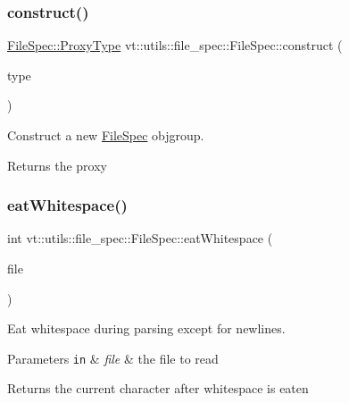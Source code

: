 \subsubsection{\texorpdfstring{construct()}{construct()}}
{\footnotesize\ttfamily \hyperlink{structvt_1_1utils_1_1file__spec_1_1_file_spec_ac4ad61ed146069ab671ec1bf909ebded}{File\+Spec\+::\+Proxy\+Type} vt\+::utils\+::file\+\_\+spec\+::\+File\+Spec\+::construct (\begin{DoxyParamCaption}\item[{\hyperlink{namespacevt_1_1utils_1_1file__spec_adc8912eb2949ca15d0f29afc0342f71e}{File\+Spec\+Type}}]{type }\end{DoxyParamCaption})\hspace{0.3cm}{\ttfamily [static]}}



Construct a new {\ttfamily \hyperlink{structvt_1_1utils_1_1file__spec_1_1_file_spec}{File\+Spec}} objgroup. 

\begin{DoxyReturn}{Returns}
the proxy 
\end{DoxyReturn}
\mbox{\label{structvt_1_1utils_1_1file__spec_1_1_file_spec_a8e57a8e3efd0e8dc640419de684d6490}} 
\subsubsection{\texorpdfstring{eat\+Whitespace()}{eatWhitespace()}}
{\footnotesize\ttfamily int vt\+::utils\+::file\+\_\+spec\+::\+File\+Spec\+::eat\+Whitespace (\begin{DoxyParamCaption}\item[{std\+::ifstream \&}]{file }\end{DoxyParamCaption})\hspace{0.3cm}{\ttfamily [private]}}



Eat whitespace during parsing except for newlines. 


\begin{DoxyParams}[1]{Parameters}
\mbox{\tt in}  & {\em file} & the file to read\\
\hline
\end{DoxyParams}
\begin{DoxyReturn}{Returns}
the current character after whitespace is eaten 
\end{DoxyReturn}
\mbox{\label{structvt_1_1utils_1_1file__spec_1_1_file_spec_a74d53e3d243f0f26ec0be262bb07948c}} 
